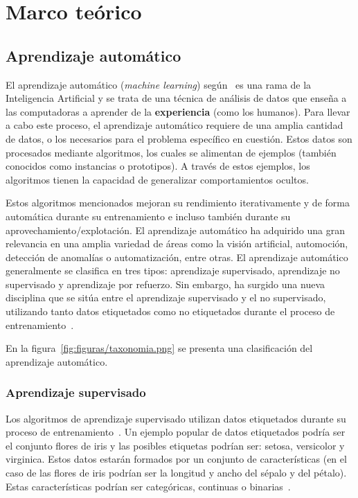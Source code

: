 
\chapter{Marco teórico}
\label{marco-teorico}

\section{Aprendizaje automático}

El aprendizaje automático (\textit{machine
learning}) según~\cite{intelligent:ml} es una rama de la Inteligencia Artificial y se trata de una técnica de análisis de datos que enseña a las computadoras a aprender de la \textbf{experiencia} (como los humanos). Para llevar a cabo este proceso, el aprendizaje automático requiere de una amplia cantidad de datos, o los necesarios para el problema específico en cuestión. Estos datos son procesados mediante algoritmos, los cuales se alimentan de ejemplos (también conocidos como instancias o prototipos). A través de estos ejemplos, los algoritmos tienen la capacidad de generalizar comportamientos ocultos.

Estos algoritmos mencionados mejoran su rendimiento iterativamente y de forma automática durante su entrenamiento e incluso también durante su aprovechamiento/explotación. El aprendizaje automático ha adquirido una gran relevancia en una amplia variedad de áreas como la visión artificial, automoción, detección de anomalías o automatización, entre otras. El aprendizaje automático generalmente se clasifica en tres tipos: aprendizaje supervisado, aprendizaje no supervisado y aprendizaje por refuerzo. Sin embargo, ha surgido una nueva disciplina que se sitúa entre el aprendizaje supervisado y el no supervisado, utilizando tanto datos etiquetados como no etiquetados durante el proceso de entrenamiento~\cite{vanEngelen2020}.

En la figura~\ref{fig:figuras/taxonomia.png} se presenta una clasificación del aprendizaje automático.


\subsection{Aprendizaje supervisado}
\label{aprendizaje-supervisado}

Los algoritmos de aprendizaje supervisado utilizan datos etiquetados durante su proceso de entrenamiento~\cite{david:sl}. Un ejemplo popular de datos etiquetados podría ser el conjunto flores de iris y las posibles etiquetas podrían ser: setosa, versicolor y virginica. Estos datos estarán formados por un conjunto de características (en el caso de las flores de iris podrían ser la longitud y ancho del sépalo y del pétalo). Estas características podrían ser categóricas, continuas o binarias~\cite{salim:sl}.

